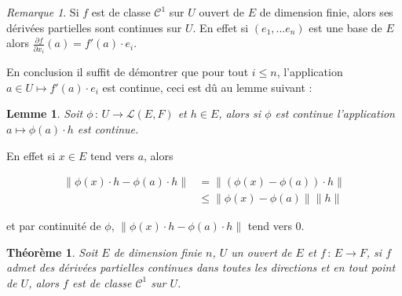 \documentclass[]{article}
\newtheorem{mythm}{Théorème}
\newtheorem{mylemma}{Lemme}
\theoremstyle{remark}
\newtheorem{myrem}{Remarque}
\theoremstyle{definition}
\newcommand{\funcshort}[3]{
#1 \, : \, #2 \longrightarrow #3
}
\begin{document}
\begin{myrem}
	Si $f$ est de classe $\mathcal{C}^1$ sur $U$ ouvert de $E$  de dimension finie, alors ses dérivées partielles sont continues sur $U$. En effet si $(e_1, ... e_n)$ est une base de $E$ alors $\displaystyle \frac{\partial f}{\partial x_i}(a) = f'(a) \cdot e_i$.
	
	En conclusion il suffit de démontrer que pour tout $i \leqslant n$, l'application $a \in U \mapsto f'(a) \cdot e_i$ est continue, ceci est dû au lemme suivant :
\end{myrem}

\begin{mylemma}
	Soit $\funcshort{\phi}{U}{\mathcal{L}(E, F)}$ et $h \in E$, alors si $\phi$ est continue l'application $a \mapsto \phi(a) \cdot h$ est continue.
\end{mylemma}

En effet si $x \in E$ tend vers $a$, alors

$$\begin{aligned}
\|\phi(x) \cdot h - \phi(a) \cdot h\| &= \|(\phi(x)-\phi(a)) \cdot h\| \\
& \leqslant \|\phi(x) - \phi(a)\| \|h\| 
\end{aligned}$$

et par continuité de $\phi$, $\|\phi(x) \cdot h - \phi(a) \cdot h\|$ tend vers 0.

\begin{mythm}
	Soit $E$ de dimension finie $n$, $U$ un ouvert de $E$ et $\funcshort{f}{E}{F}$, si $f$ admet des dérivées partielles continues dans toutes les directions et en tout point de $U$, alors $f$ est de classe $\mathcal{C}^1$ sur $U$.
\end{mythm}
\end{document}
